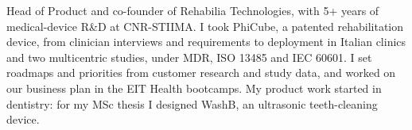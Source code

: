 {Head of Product and co-founder of Rehabilia Technologies, with 5+ years of medical-device R\&D at CNR-STIIMA. I took PhiCube, a patented rehabilitation device, from clinician interviews and requirements to deployment in Italian clinics and two multicentric studies, under MDR, ISO 13485 and IEC 60601. I set roadmaps and priorities from customer research and study data, and worked on our business plan in the EIT Health bootcamps. My product work started in dentistry: for my MSc thesis I designed WashB, an ultrasonic teeth-cleaning device.}
